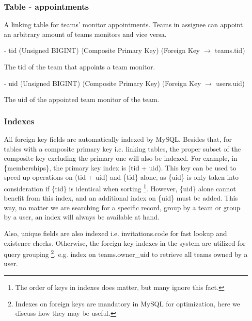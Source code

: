 \documentclass[12pt]{report}
\newcommand{\n}{\par}
\newcommand{\br}{\n\vspace{1 em}\n}
\begin{document}
\subsubsection{Table - appointments} \label{data-layer.design.team-system.memberships}
A linking table for teams' monitor appointments.
Teams in assignee can appoint an arbitrary amount of teams monitors and vice versa.
\br
- tid (Unsigned BIGINT) (Composite Primary Key) (Foreign Key $\rightarrow$ teams.tid)\n
The tid of the team that appoints a team monitor.
\br
- uid (Unsigned BIGINT) (Composite Primary Key) (Foreign Key $\rightarrow$ users.uid)\n
The uid of the appointed team monitor of the team.

\subsubsection{Indexes} \label{data-layer.design.team-system.indexes}
All foreign key fields are automatically indexed by MySQL.
Besides that, for tables with a composite primary key i.e. linking tables,
the proper subset of the composite key excluding the primary one will also be indexed.
For example, in \{memberships\}, the primary key index is (tid + uid).
This key can be used to speed up operations on (tid + uid) and \{tid\} alone,
as \{uid\} is only taken into consideration if \{tid\} is identical when sorting
\footnote{The order of keys in indexes does matter, but many ignore this fact.}.
However, \{uid\} alone cannot benefit from this index, and an additional index on \{uid\} must be added.
This way, no matter we are searching for a specific record, group by a team or group by a user,
an index will always be available at hand.\n
Also, unique fields are also indexed i.e. invitations.code for fast lookup and existence checks.
Otherwise, the foreign key indexes in the system are utilized for query grouping
\footnote{Indexes on foreign keys are mandatory in MySQL for optimization, here we discuss how they may be useful.},
e.g. index on teams.owner\_uid to retrieve all teams owned by a user.
\end{document}
